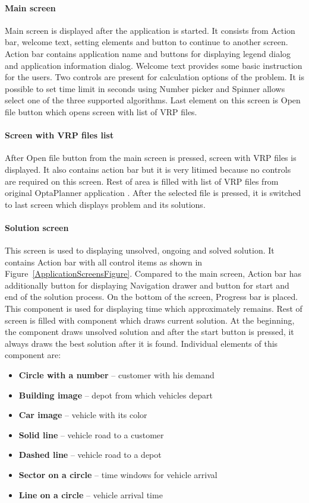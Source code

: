 \paragraph{Main screen}
Main screen is displayed after the application is started. It consists from Action bar, welcome text, setting elements
and button to continue to another screen. Action bar contains application name and buttons for displaying legend dialog
and application information dialog. Welcome text provides some basic instruction for the users. Two controls are present
for calculation options of the problem. It is possible to set time limit in seconds using Number picker and Spinner
allows select one of the three supported algorithms. Last element on this screen is Open file button which opens screen
with list of VRP files.

\paragraph{Screen with VRP files list} After Open file button from the main screen is pressed, screen with VRP files is
displayed. It also contains action bar but it is very litimed because no controls are required on this screen. Rest of
area is filled with list of VRP files from original OptaPlanner application \cite{OptaPlannerDistribution}. After the
selected file is pressed, it is switched to last screen which displays problem and its solutions.

\paragraph{Solution screen}
This screen is used to displaying unsolved, ongoing and solved solution. It contains Action bar with all control items
as shown in Figure~\ref{ApplicationScreensFigure}. Compared to the main screen, Action bar has additionally button for
displaying Navigation drawer and button for start and end of the solution process. On the bottom of the screen, Progress
bar is placed. This component is used for displaying time which approximately remains. Rest of screen is filled with
component which draws current solution. At the beginning, the component draws unsolved solution and after the start
button is pressed, it always draws the best solution after it is found. Individual elements of this component are:

\begin{itemize}
  \item \textbf{Circle with a number} -- customer with his demand
  \item \textbf{Building image} -- depot from which vehicles depart
  \item \textbf{Car image} -- vehicle with its color
  \item \textbf{Solid line} -- vehicle road to a customer
  \item \textbf{Dashed line} -- vehicle road to a depot
  \item \textbf{Sector on a circle} -- time windows for vehicle arrival
  \item \textbf{Line on a circle} -- vehicle arrival time
\end{itemize}

